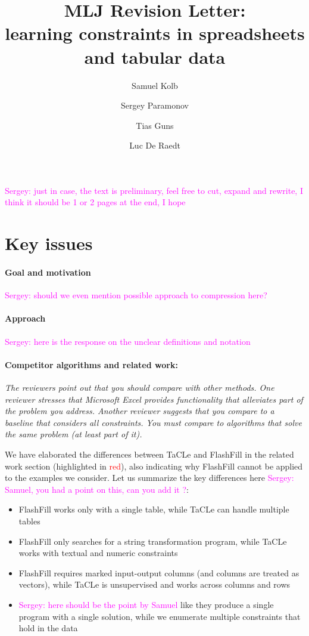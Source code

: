 \documentclass{article}
\author{Samuel Kolb \and Sergey Paramonov \and Tias Guns \and Luc {De Raedt}}
\title{MLJ Revision Letter:\\ learning constraints in spreadsheets and tabular data}
\newcommand{\sergey}[1]{\textcolor{magenta}{{\sc Sergey:} #1}\xspace}
\begin{document}
\maketitle
\sergey{just in case, the text is preliminary, feel free to cut, expand and rewrite, I think it should be 1 or 2 pages at the end, I hope}
\section{Key issues}

\paragraph{Goal and motivation}
\sergey{should we even mention possible approach to compression here?}

\paragraph{Approach}
\sergey{here is the response on the unclear definitions and notation}

\paragraph{Competitor algorithms and related work:} \textit{The reviewers point out that you should compare with other methods. One reviewer stresses that Microsoft Excel provides functionality that alleviates part of the problem you address. Another reviewer suggests that you compare to a baseline that considers all constraints. You must compare to algorithms that solve the same problem (at least part of it).}


We have elaborated the differences between TaCLe and FlashFill in the related work section (highlighted in \textcolor{red}{red}), also indicating why FlashFill cannot be applied to the examples we consider. Let us summarize the key differences here \sergey{Samuel, you had a point on this, can you add it ?}:
\begin{itemize}
  \item FlashFill works only with a single table, while TaCLe can handle multiple tables
  \item FlashFill only searches for a string transformation program, while TaCLe works with textual and numeric constraints
  \item FlashFill requires marked input-output columns (and columns are treated as vectors), while TaCLe is unsupervised and works across columns and rows
  \item \sergey{here should be the point by Samuel} like they produce a single program with a single solution, while we enumerate multiple constraints that hold in the data
\end{itemize}
\end{document}
